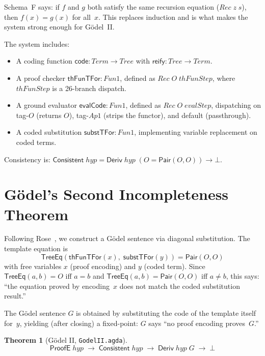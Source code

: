 \documentclass[11pt]{article}
\newtheorem{theorem}{Theorem}
\newcommand{\Deriv}{\mathsf{Deriv}}
\newcommand{\ProofE}{\mathsf{ProofE}}
\newcommand{\evalCode}{\mathsf{evalCode}}
\newcommand{\thFunTFor}{\mathsf{thFunTFor}}
\newcommand{\substTFor}{\mathsf{substTFor}}
\newcommand{\reify}{\mathsf{reify}}
\newcommand{\code}{\mathsf{code}}
\newcommand{\Consistent}{\mathsf{Consistent}}
\newcommand{\Pair}{\mathsf{Pair}}
\newcommand{\TreeEq}{\mathsf{TreeEq}}
\begin{document}
Schema~F says: if $f$ and $g$ both satisfy the same recursion
equation ($\mathit{Rec}\;z\;s$), then $f(x) = g(x)$ for all~$x$.
This replaces induction and is what makes the system strong
enough for G\"odel~II.

The system includes:
\begin{itemize}
\item A coding function $\code : \mathit{Term} \to \mathit{Tree}$
  with $\reify : \mathit{Tree} \to \mathit{Term}$.
\item A proof checker $\thFunTFor : \mathit{Fun1}$, defined as
  $\mathit{Rec}\;O\;\mathit{thFunStep}$, where $\mathit{thFunStep}$
  is a 26-branch dispatch.
\item A ground evaluator $\evalCode : \mathit{Fun1}$, defined as
  $\mathit{Rec}\;O\;\mathit{evalStep}$, dispatching on tag-$O$
  (returns $O$), tag-$\mathit{Ap1}$ (strips the functor), and
  default (passthrough).
\item A coded substitution $\substTFor : \mathit{Fun1}$, implementing
  variable replacement on coded terms.
\end{itemize}

Consistency is: $\Consistent\;\mathit{hyp} = \Deriv\;\mathit{hyp}\;(O = \Pair(O,O)) \to \bot$.

\section{G\"odel's Second Incompleteness Theorem}

Following Rose~\cite{rose1961}, we construct a G\"odel sentence via diagonal substitution.
The template equation is
\[
  \TreeEq(\thFunTFor(x),\;\substTFor(y)) = \Pair(O,O)
\]
with free variables $x$ (proof encoding) and $y$ (coded term).
Since $\TreeEq(a,b) = O$ iff $a = b$ and $\TreeEq(a,b) = \Pair(O,O)$ iff $a \ne b$,
this says: ``the equation proved by encoding~$x$ does not match the
coded substitution result.''

The G\"odel sentence $G$ is obtained by substituting the code of the
template itself for~$y$, yielding (after closing)
a fixed-point: $G$ says ``no proof encoding proves~$G$.''

\begin{theorem}[G\"odel II, \texttt{GodelII.agda}]
\[
  \ProofE\;\mathit{hyp} \;\to\; \Consistent\;\mathit{hyp} \;\to\;
  \Deriv\;\mathit{hyp}\;G \;\to\; \bot
\]
\end{theorem}
\end{document}
